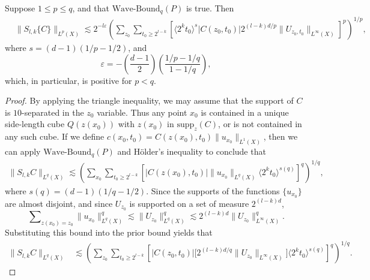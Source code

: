 \begin{lemma} \label{lemma:scaleupbound}
    Suppose $1 \leq p \leq q$, and that $\text{Wave-Bound}_q(P)$ is true. Then
    \begin{align*}
        &\| S_{l,k} \{ C \} \|_{L^p(X)}  \lesssim 2^{- l \varepsilon} \left( \sum\nolimits_{z_0} \sum\nolimits_{t_0 \geq 2^{l-k}} \left[ \langle 2^k t_0 \rangle^s |C(z_0,t_0)| 2^{(l-k)d/p} \| U_{z_0,t_0} \|_{L^\infty(X)} \right]^p \right)^{1/p},
    \end{align*}
    where $s = (d-1)(1/p - 1/2)$, and
    \[ \varepsilon = - \left( \frac{d-1}{2} \right) \left( \frac{1/p - 1/q}{1 - 1/q} \right), \]
    which, in particular, is positive for $p < q$.
\end{lemma}
\begin{proof}
    By applying the triangle inequality, we may assume that the support of $C$ is $10$-separated in the $z_0$ variable. Thus any point $x_0$ is contained in a unique side-length cube $Q(z(x_0))$ with $z(x_0)$ in $\text{supp}_z(C)$, or is not contained in any such cube. If we define $c(x_0,t_0) = C(z(x_0),t_0) \| u_{x_0} \|_{L^1(X)}$, then we can apply $\text{Wave-Bound}_q(P)$ and H\"{o}lder's inequality to conclude that
    \begin{equation}
    \begin{split}
      \| S_{l,k} C \|_{L^q(X)} \lesssim \left( \sum\nolimits_{x_0} \sum\nolimits_{t_0 \geq 2^{l-k}} \left[ |C(z(x_0),t_0)| \| u_{x_0} \|_{L^q(X)} \langle 2^k t_0 \rangle^{s(q)} \right]^q \right)^{1/q},
    \end{split}
    \end{equation}
    where $s(q) = (d-1)(1/q - 1/2)$. Since the supports of the functions $\{ u_{x_0} \}$ are almost disjoint, and since $U_{z_0}$ is supported on a set of measure $2^{(l-k)d}$,
    \begin{equation}
        \sum\nolimits_{z(x_0) = z_0} \| u_{x_0} \|_{L^q(X)}^q \lesssim \| U_{z_0} \|_{L^q(X)}^q \lesssim 2^{(l-k)d} \| U_{z_0} \|_{L^\infty(X)}^q.
    \end{equation}
    Substituting this bound into the prior bound yields that
    \begin{equation}
    \begin{split}
        \| S_{l,k} C \|_{L^q(X)} &\lesssim \left( \sum\nolimits_{z_0} \sum\nolimits_{t_0 \geq 2^{l-k}} \left[ |C(z_0,t_0)| \big[ 2^{(l-k)d/q} \| U_{z_0} \|_{L^\infty(X)} \big] \langle 2^k t_0 \rangle^{s(q)} \right]^q \right)^{1/q}.

\end{split}
\end{equation}
\end{proof}

